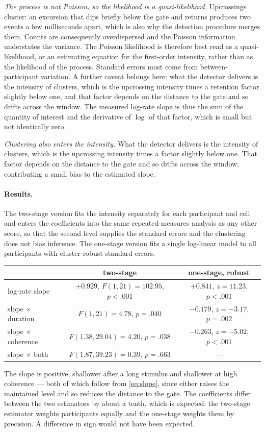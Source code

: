 \emph{The process is not Poisson, so the likelihood is a quasi-likelihood.} Upcrossings
cluster: an excursion that dips briefly below the gate and returns produces two events a
few milliseconds apart, which is also why the detection procedure merges them. Counts
are consequently overdispersed and the Poisson information understates the variance.
The Poisson likelihood is therefore best read as a quasi-likelihood, or an estimating
equation for the first-order intensity, rather than as the likelihood of the process.
Standard errors must come from between-participant variation. A further caveat belongs
here: what the detector delivers is the intensity of clusters, which is the upcrossing
intensity times a retention factor slightly below one, and that factor depends on the
distance to the gate and so drifts across the window. The measured log-rate slope is thus
the sum of the quantity of interest and the derivative of $\log$ of that factor, which is
small but not identically zero.

\emph{Clustering also enters the intensity.} What the detector delivers is the intensity
of clusters, which is the upcrossing intensity times a factor slightly below one. That
factor depends on the distance to the gate and so drifts across the window, contributing
a small bias to the estimated slope.

\paragraph{Results.}  The
two-stage version fits the intensity separately for each participant and cell and enters
the coefficients into the same repeated-measures analysis as any other score, so that the
second level supplies the standard errors and the clustering does not bias inference. The
one-stage version fits a single log-linear model to all participants with cluster-robust
standard errors.

\begin{center}
\begin{tabular}{lcc}
\toprule
& two-stage & one-stage, robust\\
\midrule
log-rate slope & $+0.929$, $F(1,21)=102.95$, $p<.001$ & $+0.841$, $z=11.23$, $p<.001$\\
slope $\times$ duration & $F(1,21)=4.78$, $p=.040$ & $-0.179$, $z=-3.17$, $p=.002$\\
slope $\times$ coherence & $F(1.38,29.04)=4.20$, $p=.038$ & $-0.263$, $z=-5.02$, $p<.001$\\
slope $\times$ both & $F(1.87,39.23)=0.39$, $p=.663$ & ---\\
\bottomrule
\end{tabular}
\end{center}

The slope is positive, shallower after a long stimulus and shallower at high coherence
--- both of which follow from \eqref{eq:slope}, since either raises the maintained level
and so reduces the distance to the gate. The coefficients differ between the two estimators by about a tenth, which is expected: the
two-stage estimator weights participants equally and the one-stage weights them by
precision. A difference in sign would not have been expected.


